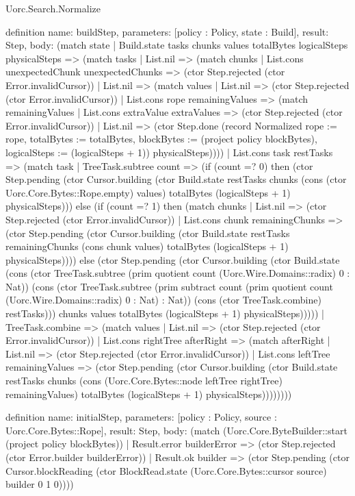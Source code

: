 \begin{lexlean}{Uorc.Search.Normalize}
\begin{semanticmodule}
definition{
  name: buildStep,
  parameters: [policy : Policy, state : Build],
  result: Step,
  body: (match state
    | Build.state tasks chunks values totalBytes logicalSteps physicalSteps => (match tasks
      | List.nil => (match chunks
        | List.cons unexpectedChunk unexpectedChunks => (ctor Step.rejected (ctor Error.invalidCursor))
        | List.nil => (match values
          | List.nil => (ctor Step.rejected (ctor Error.invalidCursor))
          | List.cons rope remainingValues => (match remainingValues
            | List.cons extraValue extraValues => (ctor Step.rejected (ctor Error.invalidCursor))
            | List.nil => (ctor Step.done (record Normalized {rope := rope, totalBytes := totalBytes, blockBytes := (project policy blockBytes), logicalSteps := (logicalSteps + 1)}) physicalSteps))))
      | List.cons task restTasks => (match task
        | TreeTask.subtree count => (if (count =? 0) then (ctor Step.pending (ctor Cursor.building (ctor Build.state restTasks chunks (cons (ctor Uorc.Core.Bytes::Rope.empty) values) totalBytes (logicalSteps + 1) physicalSteps))) else (if (count =? 1) then (match chunks
          | List.nil => (ctor Step.rejected (ctor Error.invalidCursor))
          | List.cons chunk remainingChunks => (ctor Step.pending (ctor Cursor.building (ctor Build.state restTasks remainingChunks (cons chunk values) totalBytes (logicalSteps + 1) physicalSteps)))) else (ctor Step.pending (ctor Cursor.building (ctor Build.state (cons (ctor TreeTask.subtree (prim quotient count (Uorc.Wire.Domains::radix) 0 : Nat)) (cons (ctor TreeTask.subtree (prim subtract count (prim quotient count (Uorc.Wire.Domains::radix) 0 : Nat) : Nat)) (cons (ctor TreeTask.combine) restTasks))) chunks values totalBytes (logicalSteps + 1) physicalSteps)))))
        | TreeTask.combine => (match values
          | List.nil => (ctor Step.rejected (ctor Error.invalidCursor))
          | List.cons rightTree afterRight => (match afterRight
            | List.nil => (ctor Step.rejected (ctor Error.invalidCursor))
            | List.cons leftTree remainingValues => (ctor Step.pending (ctor Cursor.building (ctor Build.state restTasks chunks (cons (Uorc.Core.Bytes::node leftTree rightTree) remainingValues) totalBytes (logicalSteps + 1) physicalSteps))))))))
}

definition{
  name: initialStep,
  parameters: [policy : Policy, source : Uorc.Core.Bytes::Rope],
  result: Step,
  body: (match (Uorc.Core.ByteBuilder::start (project policy blockBytes))
    | Result.error builderError => (ctor Step.rejected (ctor Error.builder builderError))
    | Result.ok builder => (ctor Step.pending (ctor Cursor.blockReading (ctor BlockRead.state (Uorc.Core.Bytes::cursor source) builder 0 1 0))))
}


\end{semanticmodule}
\end{lexlean}
